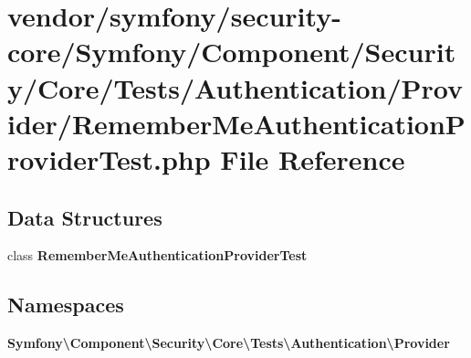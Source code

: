 \section{vendor/symfony/security-\/core/\+Symfony/\+Component/\+Security/\+Core/\+Tests/\+Authentication/\+Provider/\+Remember\+Me\+Authentication\+Provider\+Test.php File Reference}
\label{_remember_me_authentication_provider_test_8php}
\subsection*{Data Structures}
\begin{DoxyCompactItemize}
\item 
class {\bf Remember\+Me\+Authentication\+Provider\+Test}
\end{DoxyCompactItemize}
\subsection*{Namespaces}
\begin{DoxyCompactItemize}
\item 
 {\bf Symfony\textbackslash{}\+Component\textbackslash{}\+Security\textbackslash{}\+Core\textbackslash{}\+Tests\textbackslash{}\+Authentication\textbackslash{}\+Provider}
\end{DoxyCompactItemize}
